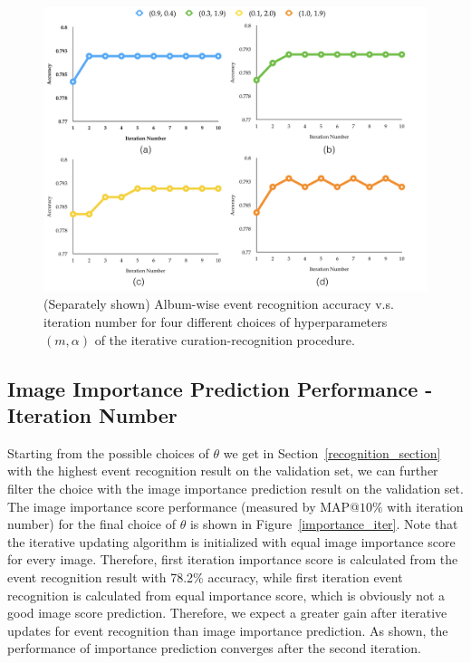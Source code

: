 \documentclass[runningheads]{llncs}
\begin{document}
\begin{figure}
\vspace{-0.1in}
\centering
\includegraphics[width=4.8in]{recognition_iter}
\caption{ (Separately shown) Album-wise event recognition accuracy v.s. iteration number for four different choices of hyperparameters $ (m, \alpha)$ of the iterative curation-recognition procedure.}
\label{recognition_iter}
\vspace{-0.2in}
\end{figure}

\subsection{Image Importance Prediction Performance - Iteration Number }
\label{importance_section}
Starting from the possible choices of $\theta$ we get in Section~\ref{recognition_section} with the highest event recognition result on the validation set, we can further filter the choice with the image importance prediction result on the validation set. The image importance score performance (measured by MAP@$10\%$ with iteration number) for the final choice of $\theta$ is shown in Figure~\ref{importance_iter}. Note that the iterative updating algorithm is initialized with equal image importance score for every image. Therefore, first iteration importance score is calculated from the event recognition result with 78.2\% accuracy, while first iteration event recognition is calculated from equal importance score, which is  obviously not a good image score prediction. Therefore, we expect a greater gain after iterative updates for event recognition than image importance prediction. As shown, the performance of importance prediction converges after the second iteration.
\end{document}
